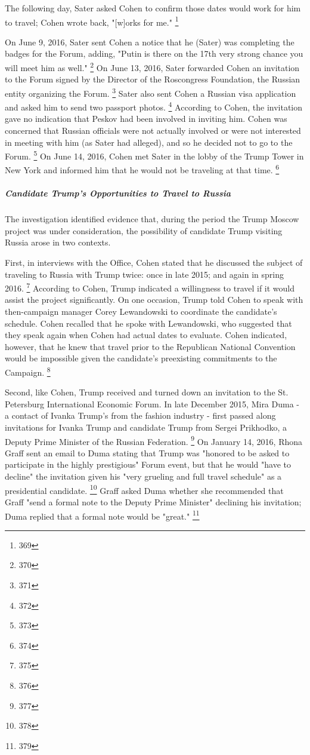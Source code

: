 The following day, Sater asked Cohen to confirm those dates would work for him to travel; Cohen wrote back, "[w]orks for me."%
\footnote{369}

On June 9, 2016, Sater sent Cohen a notice that he (Sater) was completing the badges for the Forum, adding, "Putin is there on the 17th very strong chance you will meet him as well."%
\footnote{370}
On June 13, 2016, Sater forwarded Cohen an invitation to the Forum signed by the Director of the Roscongress Foundation, the Russian entity organizing the Forum.%
\footnote{371}
Sater also sent Cohen a Russian visa application and asked him to send two passport photos.%
\footnote{372}
According to Cohen, the invitation gave no indication that Peskov had been involved in inviting him.
Cohen was concerned that Russian officials were not actually involved or were not interested in meeting with him (as Sater had alleged), and so he decided not to go to the Forum.%
\footnote{373}
On June 14, 2016, Cohen met Sater in the lobby of the Trump Tower in New York and informed him that he would not be traveling at that time.%
\footnote{374}

\subparagraph{Candidate Trump's Opportunities to Travel to Russia}

The investigation identified evidence that, during the period the Trump Moscow project was under consideration, the possibility of candidate Trump visiting Russia arose in two contexts.

First, in interviews with the Office, Cohen stated that he discussed the subject of traveling to Russia with Trump twice: once in late 2015; and again in spring 2016.%
\footnote{375}
According to Cohen, Trump indicated a willingness to travel if it would assist the project significantly.
On one occasion, Trump told Cohen to speak with then-campaign manager Corey Lewandowski to coordinate the candidate's schedule.
Cohen recalled that he spoke with Lewandowski, who suggested that they speak again when Cohen had actual dates to evaluate.
Cohen indicated, however, that he knew that travel prior to the Republican National Convention would be impossible given the candidate's preexisting commitments to the Campaign.%
\footnote{376}

Second, like Cohen, Trump received and turned down an invitation to the St. Petersburg International Economic Forum.
In late December 2015, Mira Duma - a contact of Ivanka Trump's from the fashion industry - first passed along invitations for Ivanka Trump and candidate Trump from Sergei Prikhodko, a Deputy Prime Minister of the Russian Federation.%
\footnote{377}
On January 14, 2016, Rhona Graff sent an email to Duma stating that Trump was "honored to be asked to participate in the highly prestigious" Forum event, but that he would "have to decline" the invitation given his "very grueling and full travel schedule" as a presidential candidate.%
\footnote{378}
Graff asked Duma whether she recommended that Graff "send a formal note to the Deputy Prime Minister" declining his invitation; Duma replied that a formal note would be "great."%
\footnote{379}


